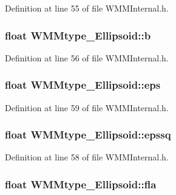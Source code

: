 Definition at line 55 of file W\-M\-M\-Internal.\-h.

\hypertarget{struct_w_m_mtype___ellipsoid_a6fa136040ff9c95d8681b3ed1522961a}{
\subsubsection[{b}]{\setlength{\rightskip}{0pt plus 5cm}float W\-M\-Mtype\-\_\-\-Ellipsoid\-::b}}\label{struct_w_m_mtype___ellipsoid_a6fa136040ff9c95d8681b3ed1522961a}


Definition at line 56 of file W\-M\-M\-Internal.\-h.

\hypertarget{struct_w_m_mtype___ellipsoid_ab0125e1a063bfd086922e84040946912}{
\subsubsection[{eps}]{\setlength{\rightskip}{0pt plus 5cm}float W\-M\-Mtype\-\_\-\-Ellipsoid\-::eps}}\label{struct_w_m_mtype___ellipsoid_ab0125e1a063bfd086922e84040946912}


Definition at line 59 of file W\-M\-M\-Internal.\-h.

\hypertarget{struct_w_m_mtype___ellipsoid_a15d66d7d6873c33670330e639d548626}{
\subsubsection[{epssq}]{\setlength{\rightskip}{0pt plus 5cm}float W\-M\-Mtype\-\_\-\-Ellipsoid\-::epssq}}\label{struct_w_m_mtype___ellipsoid_a15d66d7d6873c33670330e639d548626}


Definition at line 58 of file W\-M\-M\-Internal.\-h.

\hypertarget{struct_w_m_mtype___ellipsoid_a4bfc3186db2254aa1de93bfd694b420b}{
\subsubsection[{fla}]{\setlength{\rightskip}{0pt plus 5cm}float W\-M\-Mtype\-\_\-\-Ellipsoid\-::fla}}\label{struct_w_m_mtype___ellipsoid_a4bfc3186db2254aa1de93bfd694b420b}


